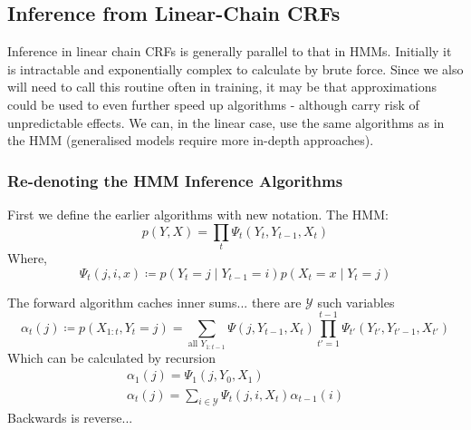 \documentclass[../main.tex]{subfiles}
\begin{document}


\subsection{Inference from Linear-Chain CRFs}

Inference in linear chain CRFs is generally parallel to that in HMMs.
Initially it is intractable and exponentially complex to calculate by brute force.
Since we also will need to call this routine often in training, it may be that approximations could be used to even further speed up algorithms - although carry risk of unpredictable effects.
We can, in the linear case, use the same algorithms as in the HMM (generalised models require more in-depth approaches).

\subsubsection{Re-denoting the HMM Inference Algorithms}
First we define the earlier algorithms with new notation.
The HMM:
\begin{equation*}
    p (Y,X) = \prod_t \Psi_t (Y_t, Y_{t-1}, X_t)
\end{equation*}
Where,
\begin{equation*}
    \Psi_t(j,i,x) \coloneqq p (Y_t=j \mid Y_{t-1}=i) p (X_t=x \mid Y_t=j)
\end{equation*}

The forward algorithm caches inner sums... there are $\mathcal{Y}$ such variables
\begin{equation*}
    \alpha_t(j) \coloneqq p (X_{1:t},Y_t=j) = \sum_{\text{all } Y_{1:t-1}} \Psi(j,Y_{t-1},X_t) \prod_{t'=1}^{t-1} \Psi_{t'}(Y_{t'},Y_{t'-1},X_{t'})
\end{equation*}
Which can be calculated by recursion
\begin{gather*}
    \alpha_1(j) = \Psi_1(j,Y_0,X_1) \\
    \alpha_t(j) = \sum_{i \in \mathcal{Y}} \Psi_t(j,i,X_t) \alpha_{t-1}(i)
\end{gather*}
Backwards is reverse...
\end{document}
